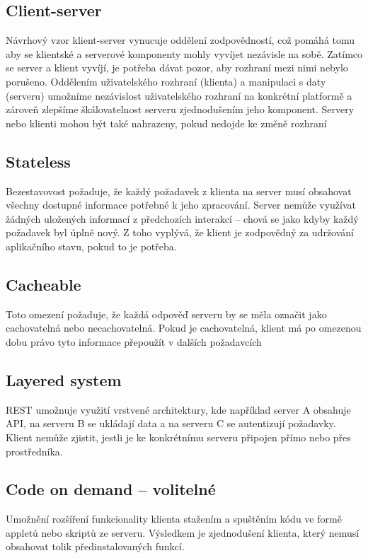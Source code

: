 \documentclass[thesis=M,czech]{FITthesis}[2019/12/23]
\begin{document}
\subsection{Client-server}
Návrhový vzor klient-server vynucuje oddělení zodpovědností, což pomáhá tomu aby se klientské a serverové komponenty mohly vyvíjet nezávisle na sobě. Zatímco se server a klient vyvíjí, je potřeba dávat pozor, aby rozhraní mezi nimi nebylo porušeno.
Oddělením uživatelského rozhraní (klienta) a manipulaci s daty (serveru) umožníme nezávislost uživatelského rozhraní na konkrétní platformě a zároveň zlepšíme škálovatelnost serveru zjednodušením jeho komponent. Servery nebo klienti mohou být také nahrazeny, pokud nedojde ke změně rozhraní

\subsection{Stateless}
Bezestavovost požaduje, že každý požadavek z klienta na server musí obsahovat všechny dostupné informace potřebné k jeho zpracování. Server nemůže využívat žádných uložených informací z předchozích interakcí -- chová se jako kdyby každý požadavek byl úplně nový. Z toho vyplývá, že klient je zodpovědný za udržování aplikačního stavu, pokud to je potřeba.

\subsection{Cacheable}
Toto omezení požaduje, že každá odpověď serveru by se měla označit jako cachovatelná nebo necachovatelná. Pokud je cachovatelná, klient má po omezenou dobu právo tyto informace přepoužít v dalších požadavcích

\subsection{Layered system}
REST umožnuje využití vrstvené architektury, kde například server A obsahuje API, na serveru B se ukládají data a na serveru C se autentizují požadavky. Klient nemůže zjistit, jestli je ke konkrétnímu serveru připojen přímo nebo přes prostředníka.

\subsection{Code on demand -- volitelné}
Umožnění rozšíření funkcionality klienta stažením a spuštěním kódu ve formě appletů nebo skriptů ze serveru. Výsledkem je zjednodušení klienta, který nemusí obsahovat tolik předinstalovaných funkcí.
\end{document}
